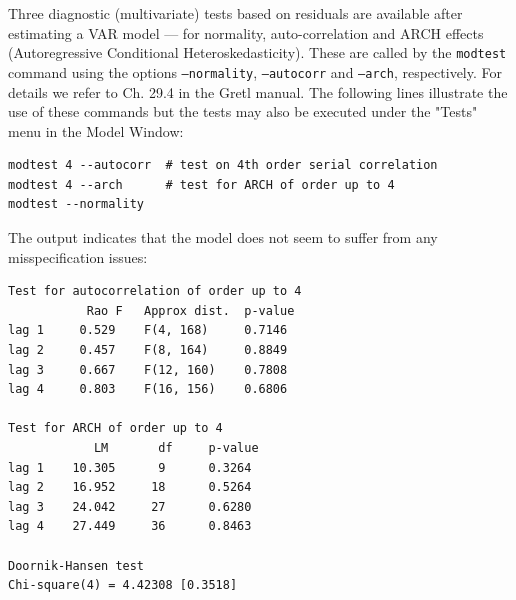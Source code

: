 \documentclass[11pt]{article}
\begin{document}

Three diagnostic (multivariate) tests based on residuals are available after estimating a VAR model --- for normality, auto-correlation and ARCH effects (Autoregressive Conditional Heteroskedasticity). These are called by the \texttt{modtest} command using the options \texttt{---normality}, \texttt{---autocorr} and \texttt{---arch}, respectively. For details we refer to Ch. 29.4 in the Gretl manual. The following lines illustrate the use of these commands but the tests may also be executed under the "Tests" menu in the Model Window:
\begin{Verbatim}[baselinestretch=0.75, fontsize=\small]
modtest 4 --autocorr  # test on 4th order serial correlation
modtest 4 --arch      # test for ARCH of order up to 4
modtest --normality
\end{Verbatim}

The output indicates that the model does not seem to suffer from any misspecification issues:
\begin{Verbatim}[baselinestretch=0.75, fontsize=\small]
Test for autocorrelation of order up to 4
           Rao F   Approx dist.  p-value
lag 1     0.529    F(4, 168)     0.7146
lag 2     0.457    F(8, 164)     0.8849
lag 3     0.667    F(12, 160)    0.7808
lag 4     0.803    F(16, 156)    0.6806

Test for ARCH of order up to 4
            LM       df     p-value
lag 1    10.305      9      0.3264
lag 2    16.952     18      0.5264
lag 3    24.042     27      0.6280
lag 4    27.449     36      0.8463

Doornik-Hansen test
Chi-square(4) = 4.42308 [0.3518]

\end{Verbatim}
\end{document}

